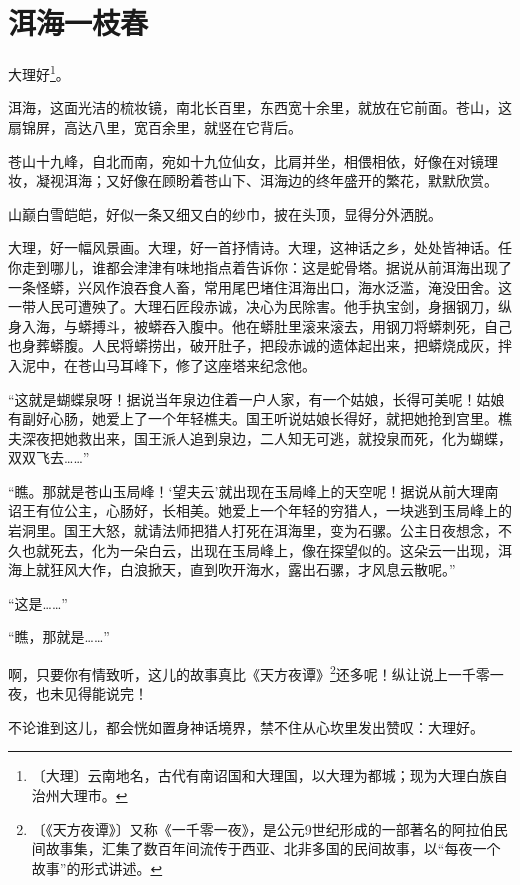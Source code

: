 \documentclass[12pt,UTF-8,openany]{ctexbook}
\begin{document}
\chapter{洱海一枝春}

\begin{normalsize}
    
    大理好\footnote{〔大理〕云南地名，古代有南诏国和大理国，以大理为都城；现为大理白族自治州大理市。}。
    
    洱海，这面光洁的梳妆镜，南北长百里，东西宽十余里，就放在它前面。苍山，这扇锦屏，高达八里，宽百余里，就竖在它背后。
    
    苍山十九峰，自北而南，宛如十九位仙女，比肩并坐，相偎相依，好像在对镜理妆，凝视洱海；又好像在顾盼着苍山下、洱海边的终年盛开的繁花，默默欣赏。
    
    山巅白雪皑皑，好似一条又细又白的纱巾，披在头顶，显得分外洒脱。
    
    大理，好一幅风景画。大理，好一首抒情诗。大理，这神话之乡，处处皆神话。任你走到哪儿，谁都会津津有味地指点着告诉你：这是蛇骨塔。据说从前洱海出现了一条怪蟒，兴风作浪吞食人畜，常用尾巴堵住洱海出口，海水泛滥，淹没田舍。这一带人民可遭殃了。大理石匠段赤诚，决心为民除害。他手执宝剑，身捆钢刀，纵身入海，与蟒搏斗，被蟒吞入腹中。他在蟒肚里滚来滚去，用钢刀将蟒刺死，自己也身葬蟒腹。人民将蟒捞出，破开肚子，把段赤诚的遗体起出来，把蟒烧成灰，拌入泥中，在苍山马耳峰下，修了这座塔来纪念他。
    
    “这就是蝴蝶泉呀！据说当年泉边住着一户人家，有一个姑娘，长得可美呢！姑娘有副好心肠，她爱上了一个年轻樵夫。国王听说姑娘长得好，就把她抢到宫里。樵夫深夜把她救出来，国王派人追到泉边，二人知无可逃，就投泉而死，化为蝴蝶，双双飞去……”
    
    “瞧。那就是苍山玉局峰！‘望夫云’就出现在玉局峰上的天空呢！据说从前大理南诏王有位公主，心肠好，长相美。她爱上一个年轻的穷猎人，一块逃到玉局峰上的岩洞里。国王大怒，就请法师把猎人打死在洱海里，变为石骡。公主日夜想念，不久也就死去，化为一朵白云，出现在玉局峰上，像在探望似的。这朵云一出现，洱海上就狂风大作，白浪掀天，直到吹开海水，露出石骡，才风息云散呢。”
    
    “这是……”
    
    “瞧，那就是……”
    
    啊，只要你有情致听，这儿的故事真比《天方夜谭》\footnote{〔《天方夜谭》〕又称《一千零一夜》，是公元9世纪形成的一部著名的阿拉伯民间故事集，汇集了数百年间流传于西亚、北非多国的民间故事，以“每夜一个故事”的形式讲述。}还多呢！纵让说上一千零一夜，也未见得能说完！
    
    不论谁到这儿，都会恍如置身神话境界，禁不住从心坎里发出赞叹：大理好。
    

\end{normalsize}
\end{document}
